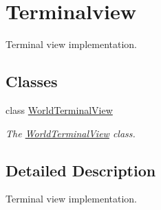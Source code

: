 \hypertarget{group__terminalview}{}\section{Terminalview}
\label{group__terminalview}


Terminal view implementation.  


\subsection*{Classes}
\begin{DoxyCompactItemize}
\item 
class \hyperlink{classWorldTerminalView}{World\+Terminal\+View}
\begin{DoxyCompactList}\small\item\em The \hyperlink{classWorldTerminalView}{World\+Terminal\+View} class. \end{DoxyCompactList}\end{DoxyCompactItemize}


\subsection{Detailed Description}
Terminal view implementation. 

